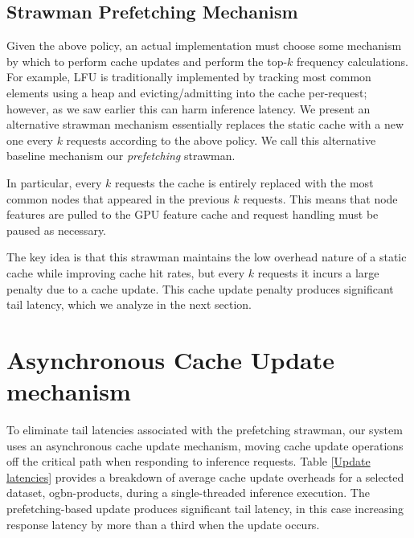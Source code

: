 

\subsection{Strawman Prefetching Mechanism}
Given the above policy, an actual implementation must choose some mechanism by which to perform cache updates and perform the top-$k$ frequency calculations. For example, LFU is traditionally implemented by tracking most common elements using a heap and evicting/admitting into the cache per-request; however, as we saw earlier this can harm inference latency. We present an alternative strawman mechanism essentially replaces the static cache with a new one every $k$ requests according to the above policy. We call this alternative baseline mechanism our \textit{prefetching} strawman. 

In particular, every $k$ requests the cache is entirely replaced with the most common nodes that appeared in the previous $k$ requests. This means that node features are pulled to the GPU feature cache and request handling must be paused as necessary. 

The key idea is that this strawman maintains the low overhead nature of a static cache while improving cache hit rates, but every $k$ requests it incurs a large penalty due to a cache update. This cache update penalty produces significant tail latency, which we analyze in the next section.

\section{Asynchronous Cache Update mechanism} \label{Design: Async Update}
 
To eliminate tail latencies associated with the prefetching strawman, our system uses an asynchronous cache update mechanism, moving cache update operations off the critical path when responding to inference requests.
Table \ref{Update latencies} provides a breakdown of average cache update overheads for a selected dataset, ogbn-products, during a single-threaded inference execution. The prefetching-based update produces significant tail latency, in this case increasing response latency by more than a third when the update occurs.


